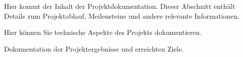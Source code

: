
Hier kommt der Inhalt der Projektdokumentation. Dieser Abschnitt enthält Details zum Projektablauf, Meilensteine und andere relevante Informationen.

Hier können Sie technische Aspekte des Projekts dokumentieren.

Dokumentation der Projektergebnisse und erreichten Ziele. 